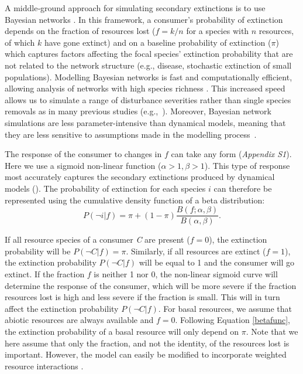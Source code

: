 \documentclass[12pt]{article}
\begin{document}
\begin{spacing}{2.0}
        
        A middle‐ground approach for simulating secondary extinctions is to use Bayesian networks \citep{Eklof2013,Haussler2020}. 
        In this framework, a consumer's probability of extinction depends on the fraction of resources lost ($f = k/n$ for a species with $n$ resources, of which $k$ have gone extinct) and on a baseline probability of extinction ($\pi$) which captures factors affecting the focal species' extinction probability that are not related to the network structure (e.g., disease, stochastic extinction of small populations).
        Modelling Bayesian networks is fast and computationally efficient, allowing analysis of networks with high species richness \citep{Haussler2020}. 
        This increased speed allows us to simulate a range of disturbance severities rather than single species removals as in many previous studies (e.g.,~\citealp[]{Memmott2004,Staniczenko2010,Dunne2004}).
        Moreover, Bayesian network simulations are less parameter-intensive than dynamical models, meaning that they are less sensitive to assumptions made in the modelling process~\citep{Eklof2013}.
    
        
        The response of the consumer to changes in $f$ can take any form (\emph{Appendix S1}). Here we use a sigmoid non-linear function ($\alpha > 1, \beta > 1$).
		This type of response most accurately captures the secondary extinctions produced by dynamical models (\citealp[]{Eklof2013}).
		The probability of extinction for each species $i$ can therefore be represented using the cumulative density function of a beta distribution:
		\begin{equation}
		P(\lnot i|f) = \pi + (1 - \pi) \frac{B(f;\alpha,\beta)}{B(\alpha,\beta)}.
				\label{betafunc}
        \end{equation}
		
		If all resource species of a consumer \textit{C} are present ($f = 0$), the extinction probability will be $P(\lnot C|f) = \pi$. 
		Similarly, if all resources are extinct ($f = 1$), the extinction probability $P(\lnot C|f)$ will be equal to 1 and the consumer will go extinct.
		If the fraction $f$ is neither 1 nor 0, the non-linear sigmoid curve will determine the response of the consumer, which will be more severe if the fraction resources lost is high and less severe if the fraction is small. This will in turn affect the extinction probability $P(\lnot C|f)$.
		For basal resources, we assume that abiotic resources are always available and $f=0$. 
		Following Equation \ref{betafunc}, the extinction probability of a basal resource will only depend on $\pi$.
		Note that we here assume that only the fraction, and not the identity, of the resources lost is important. 
		However, the model can easily be modified to incorporate weighted resource interactions \citep[see][]{Eklof2013}.
		

\end{spacing}
\end{document}
